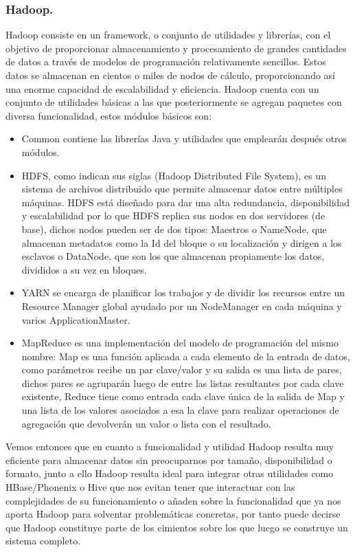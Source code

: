 \documentclass[11pt, a4paper]{article} %
\begin{document}
\subsubsection{Hadoop.}
Hadoop consiste en un framework, o conjunto de utilidades y librerías, con el objetivo de proporcionar almacenamiento y procesamiento de grandes cantidades de datos a través de modelos de programación relativamente sencillos. Estos datos se almacenan en cientos o miles de nodos de cálculo, proporcionando así una enorme capacidad de escalabilidad y eficiencia. Hadoop cuenta con un conjunto de utilidades básicas a las que posteriormente se agregan paquetes con diversa funcionalidad, estos módulos básicos son: \cite{dochadoop1} \cite{dochadoop2}
\begin{itemize}
\item Common contiene las librerías Java y utilidades que emplearán después otros módulos.
\item HDFS, como indican sus siglas (Hadoop Distributed File System), es un sistema de archivos distribuido que permite almacenar datos entre múltiples máquinas. HDFS está diseñado para dar una alta redundancia, disponibilidad y escalabilidad por lo que HDFS replica sus nodos en dos servidores (de base), dichos nodos pueden ser de dos tipos: Maestros o NameNode, que almacenan metadatos como la Id del bloque o su localización y dirigen a los esclavos o DataNode, que son los que almacenan propiamente los datos, divididos a su vez en bloques. 
\item YARN se encarga de planificar los trabajos y de dividir los recursos entre un Resource Manager global ayudado por un NodeManager en cada máquina y varios ApplicationMaster.
\item MapReduce es una implementación del modelo de programación del mismo nombre: Map es una función aplicada a cada elemento de la entrada de datos, como parámetros recibe un par clave/valor y su salida es una lista de pares, dichos pares se agruparán luego de entre las listas resultantes por cada clave existente, Reduce tiene como entrada cada clave única de la salida de Map y una lista de los valores asociados a esa la clave para realizar operaciones de agregación que devolverán un valor o lista con el resultado.
\end{itemize}


Vemos entonces que en cuanto a funcionalidad y utilidad Hadoop resulta muy eficiente para almacenar datos sin preocuparnos por tamaño, disponibilidad o formato, junto a ello Hadoop resulta ideal para integrar otras utilidades como HBase/Phonenix o Hive que nos evitan tener que interactuar con las complejidades de su funcionamiento o añaden sobre la funcionalidad que ya nos aporta Hadoop para solventar problemáticas concretas, por tanto puede decirse que Hadoop constituye parte de los cimientos sobre los que luego se construye un sistema completo. \cite{dochadoop2}
\end{document}
